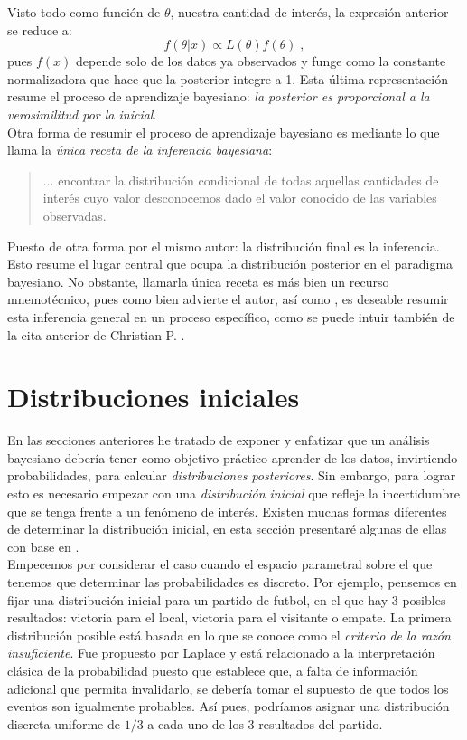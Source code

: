 Visto todo como función de $\theta$, nuestra cantidad de interés, la expresión anterior se reduce a:  
\begin{equation} \label{eq:Bayes_Prop}
f(\theta|x) \propto L(\theta)f(\theta)\;,
\end{equation}
pues $f(x)$ depende solo de los datos ya observados y funge como la constante normalizadora que hace que la posterior integre a 1. Esta última representación resume el proceso de aprendizaje bayesiano: \textit{la posterior es proporcional a la verosimilitud por la inicial}.\\ 

Otra forma de resumir el proceso de aprendizaje bayesiano es mediante lo que \textcite{GP16} llama la \textit{única receta de la inferencia bayesiana}\label{receta_bayesiana}:
\begin{quote}
... encontrar la distribución condicional de todas aquellas cantidades de interés cuyo valor desconocemos dado el valor conocido de las variables observadas.
\end{quote}
Puesto de otra forma por el mismo autor: la distribución final es la inferencia. Esto resume el lugar central que ocupa la distribución posterior en el paradigma bayesiano. No obstante, llamarla única receta es más bien un recurso mnemotécnico, pues como bien advierte el autor, así como \textcite{Berger85}, es deseable resumir esta inferencia general en un proceso específico, como se puede intuir también de la cita anterior de Christian P. \textcite{Robert07}. 

\section{Distribuciones iniciales}

En las secciones anteriores he tratado de exponer y enfatizar que un análisis bayesiano debería tener como objetivo práctico aprender de los datos, invirtiendo probabilidades, para calcular \textit{distribuciones posteriores}. Sin embargo, para lograr esto es necesario empezar con una \textit{distribución inicial} que refleje la incertidumbre que se tenga frente a un fenómeno de interés. Existen muchas formas diferentes de determinar la distribución inicial, en esta sección presentaré algunas de ellas con base en \textcites{Berger85,Congdon06,Robert07,Gelman13}.\\ 

Empecemos por considerar el caso cuando el espacio parametral sobre el que tenemos que determinar las probabilidades es discreto. Por ejemplo, pensemos en fijar una distribución inicial para un partido de futbol, en el que hay 3 posibles resultados: victoria para el local, victoria para el visitante o empate. La primera distribución posible está basada en lo que se conoce como el \textit{criterio de la razón insuficiente}. Fue propuesto por Laplace y está relacionado a la interpretación clásica de la probabilidad puesto que establece que, a falta de información adicional que permita invalidarlo, se debería tomar el supuesto de que todos los eventos son igualmente probables. Así pues, podríamos asignar una distribución discreta uniforme de $1/3$ a cada uno de los 3 resultados del partido.\\

